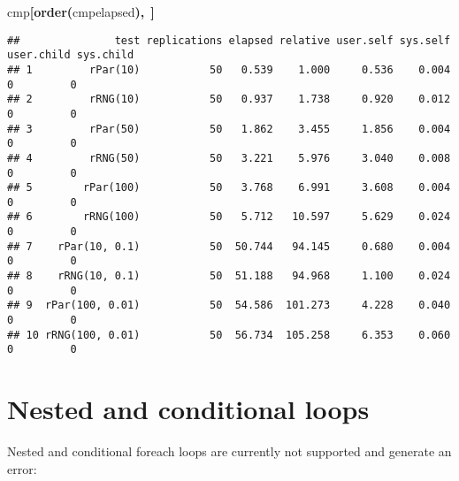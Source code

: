 \documentclass[a4paper,12pt]{article}\usepackage{graphicx, color}
\makeatletter
\newcommand{\hlfunctioncall}[1]{\textcolor[rgb]{0.501960784313725,0,0.329411764705882}{\textbf{#1}}}%
\newcommand{\hlkeyword}[1]{\textcolor[rgb]{0,0,0}{\textbf{#1}}}%
\newcommand{\hlsymbol}[1]{\textcolor[rgb]{0,0,0}{#1}}%
\newcommand{\hlstd}[1]{\textcolor[rgb]{0,0,0}{#1}}%
\newenvironment{kframe}{%
 \def\FrameCommand##1{\hskip\@totalleftmargin \hskip-\fboxsep
 \colorbox{shadecolor}{##1}\hskip-\fboxsep
     \hskip-\linewidth \hskip-\@totalleftmargin \hskip\columnwidth}%
 \MakeFramed {\advance\hsize-\width
   \@totalleftmargin\z@ \linewidth\hsize
   \@setminipage}}%
 {\par\unskip\endMakeFramed}
\newenvironment{knitrout}{}{} %
\renewenvironment{knitrout}{\begin{footnotesize}}{\end{footnotesize}}
\makeatother
\begin{document}
\begin{knitrout}
\begin{kframe}
\begin{flushleft}
\hlstd{}\hlsymbol{cmp}\hlkeyword{[}\hlfunctioncall{order}\hlkeyword{(}\hlsymbol{cmp}\hlkeyword{\usebox{\hlnormalsizeboxdollar}}\hlsymbol{elapsed}\hlkeyword{)}\hlkeyword{,}{\ }\hlkeyword{]}\mbox{}
\normalfont
\end{flushleft}
\begin{verbatim}
##               test replications elapsed relative user.self sys.self user.child sys.child
## 1         rPar(10)           50   0.539    1.000     0.536    0.004          0         0
## 2         rRNG(10)           50   0.937    1.738     0.920    0.012          0         0
## 3         rPar(50)           50   1.862    3.455     1.856    0.004          0         0
## 4         rRNG(50)           50   3.221    5.976     3.040    0.008          0         0
## 5        rPar(100)           50   3.768    6.991     3.608    0.004          0         0
## 6        rRNG(100)           50   5.712   10.597     5.629    0.024          0         0
## 7    rPar(10, 0.1)           50  50.744   94.145     0.680    0.004          0         0
## 8    rRNG(10, 0.1)           50  51.188   94.968     1.100    0.024          0         0
## 9  rPar(100, 0.01)           50  54.586  101.273     4.228    0.040          0         0
## 10 rRNG(100, 0.01)           50  56.734  105.258     6.353    0.060          0         0
\end{verbatim}
\end{kframe}
\end{knitrout}



\section{Nested and conditional loops}
\label{sec:nested}

Nested and conditional foreach loops are currently not supported and generate an error:
\end{document}
